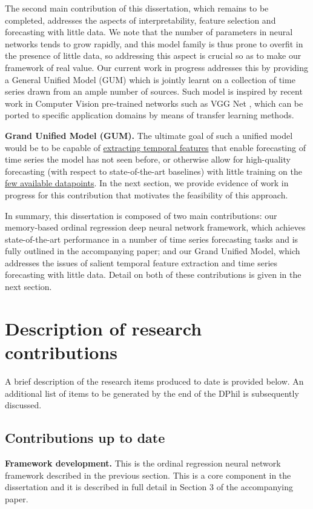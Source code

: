 \documentclass[pdftex,12pt,a4paper]{article}
\theoremstyle{definition}
\theoremstyle{remark}
\begin{document}
The second main contribution of this dissertation, which remains to be completed, addresses the aspects of interpretability, feature selection and forecasting with little data. We note that the number of parameters in neural networks tends to grow rapidly, and this model family is thus prone to overfit in the presence of little data, so addressing this aspect is crucial so as to make our framework of real value. Our current work in progress addresses this by providing a General Unified Model (GUM) which is jointly learnt on a collection of time series drawn from an ample number of sources. Such model is inspired by recent work in Computer Vision pre-trained networks such as VGG Net \cite{Simonyan2015}, which can be ported to specific application domains by means of transfer learning methods. 

\textbf{Grand Unified Model (GUM).} The ultimate goal of such a unified model would be to be capable of \underline{extracting temporal features} that enable forecasting of time series the model has not seen before, or otherwise allow for high-quality forecasting (with respect to state-of-the-art baselines) with little training on the \underline{few available datapoints}. In the next section, we provide evidence of work in progress for this contribution that motivates the feasibility of this approach. 

In summary, this dissertation is composed of two main contributions: our memory-based ordinal regression deep neural network framework, which achieves state-of-the-art performance in a number of time series forecasting tasks and is fully outlined in the accompanying paper; and our Grand Unified Model, which addresses the issues of salient temporal feature extraction and time series forecasting with little data. Detail on both of these contributions is given in the next section. 

\section{Description of research contributions}
A brief description of the research items produced to date is provided below. An additional list of items to be generated by the end of the DPhil is subsequently discussed.

\subsection{Contributions up to date}

\textbf{Framework development.} This is the ordinal regression neural network framework described in the previous section. This is a core component in the dissertation and it is described in full detail in Section 3 of the accompanying paper.
\end{document}
